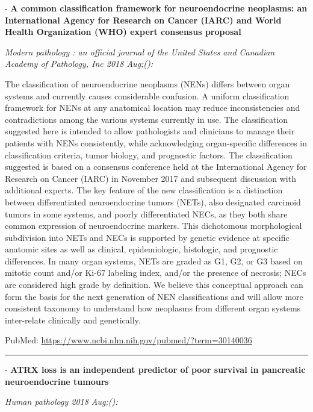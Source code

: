 \documentclass[]{article}
\begin{document}
 - \textbf{A common classification framework for neuroendocrine
neoplasms: an International Agency for Research on Cancer (IARC) and
World Health Organization (WHO) expert consensus proposal}

\emph{Modern pathology : an official journal of the United States and
Canadian Academy of Pathology, Inc 2018 Aug;():}

The classification of neuroendocrine neoplasms (NENs) differs between
organ systems and currently causes considerable confusion. A uniform
classification framework for NENs at any anatomical location may reduce
inconsistencies and contradictions among the various systems currently
in use. The classification suggested here is intended to allow
pathologists and clinicians to manage their patients with NENs
consistently, while acknowledging organ-specific differences in
classification criteria, tumor biology, and prognostic factors. The
classification suggested is based on a consensus conference held at the
International Agency for Research on Cancer (IARC) in November 2017 and
subsequent discussion with additional experts. The key feature of the
new classification is a distinction between differentiated
neuroendocrine tumors (NETs), also designated carcinoid tumors in some
systems, and poorly differentiated NECs, as they both share common
expression of neuroendocrine markers. This dichotomous morphological
subdivision into NETs and NECs is supported by genetic evidence at
specific anatomic sites as well as clinical, epidemiologic, histologic,
and prognostic differences. In many organ systems, NETs are graded as
G1, G2, or G3 based on mitotic count and/or Ki-67 labeling index, and/or
the presence of necrosis; NECs are considered high grade by definition.
We believe this conceptual approach can form the basis for the next
generation of NEN classifications and will allow more consistent
taxonomy to understand how neoplasms from different organ systems
inter-relate clinically and genetically.

PubMed: \url{https://www.ncbi.nlm.nih.gov/pubmed/?term=30140036}

{}

{}

\begin{center}\rule{0.5\linewidth}{\linethickness}\end{center}

 - \textbf{ATRX loss is an independent predictor of poor survival in
pancreatic neuroendocrine tumours}

\emph{Human pathology 2018 Aug;():}
\end{document}
